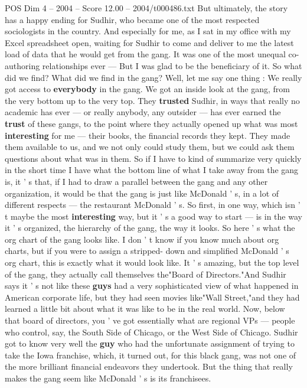 \begin{textsample}{POS Dim 4 – 2004 – Score 12.00 – 2004/t000486.txt}
But ultimately, the story has a happy ending for Sudhir, who became one of the most respected sociologists in the country.
And especially for me, as I sat in my office with my Excel spreadsheet open, waiting for Sudhir to come and deliver to me the latest load of data that he would get from the gang.
It was one of the most unequal co-authoring relationships ever — But I was glad to be the beneficiary of it.
So what did we find?
What did we find in the gang?
Well, let me say one thing : We really got access to \textbf{everybody} in the gang.
We got an inside look at the gang, from the very bottom up to the very top.
They \textbf{trusted} Sudhir, in ways that really no academic has ever — or really anybody, any outsider — has ever earned the \textbf{trust} of these gangs, to the point where they actually opened up what was most \textbf{interesting} for me — their books, the financial records they kept.
They made them available to us, and we not only could study them, but we could ask them questions about what was in them.
So if I have to kind of summarize very quickly in the short time I have what the bottom line of what I take away from the gang is, it ' s that, if I had to draw a parallel between the gang and any other organization, it would be that the gang is just like McDonald ' s, in a lot of different respects — the restaurant McDonald ' s.
So first, in one way, which isn ' t maybe the most \textbf{interesting} way, but it ' s a good way to start — is in the way it ' s organized, the hierarchy of the gang, the way it looks.
So here ' s what the org chart of the gang looks like.
I don ' t know if you know much about org charts, but if you were to assign a stripped- down and simplified McDonald ' s org chart, this is exactly what it would look like.
It ' s amazing, but the top level of the gang, they actually call themselves the"Board of Directors."And Sudhir says it ' s not like these \textbf{guys} had a very sophisticated view of what happened in American corporate life, but they had seen movies like"Wall Street,"and they had learned a little bit about what it was like to be in the real world.
Now, below that board of directors, you ' ve got essentially what are regional VPs — people who control, say, the South Side of Chicago, or the West Side of Chicago.
Sudhir got to know very well the \textbf{guy} who had the unfortunate assignment of trying to take the Iowa franchise, which, it turned out, for this black gang, was not one of the more brilliant financial endeavors they undertook.
But the thing that really makes the gang seem like McDonald ' s is its franchisees.

\end{textsample}
